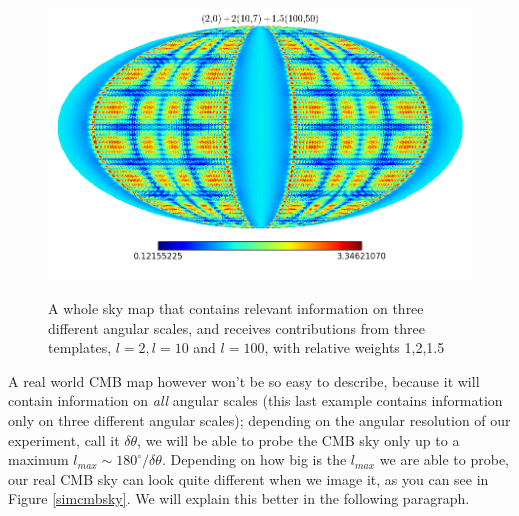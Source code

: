 \begin{figure}
\begin{center}
\includegraphics[scale=0.6]{Fourier/superp.png}
\label{}
\end{center}
\caption{A whole sky map that contains relevant information on three different angular scales, and receives contributions from three templates, $l=2,l=10$ and $l=100$, with relative weights 1,2,1.5}
\label{superp}
\end{figure}
A real world CMB map however won't be so easy to describe, because it will contain information on \textit{all} angular scales (this last example contains information only on three different angular scales); depending on the angular resolution of our experiment, call it $\delta \theta$, we will be able to probe the CMB sky only up to a maximum $l_{max}\sim 180^\circ/\delta \theta$. Depending on how big is the $l_{max}$ we are able to probe, our real CMB sky can look quite different when we image it, as you can see in Figure \ref{simcmbsky}. We will explain this better in the following paragraph. 
